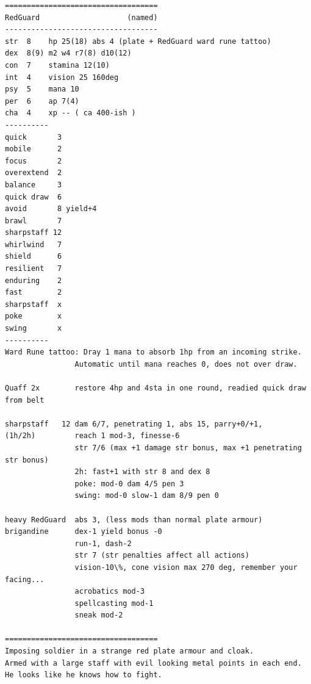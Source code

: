 \documentclass[11pt, twoside, titlepage, a4paper]{report}
\begin{document}
\goodbreak \begin{samepage} \small \begin{verbatim}
===================================
RedGuard                    (named)
-----------------------------------
str  8    hp 25(18) abs 4 (plate + RedGuard ward rune tattoo)
dex  8(9) m2 w4 r7(8) d10(12)
con  7    stamina 12(10)
int  4    vision 25 160deg
psy  5    mana 10
per  6    ap 7(4)
cha  4    xp -- ( ca 400-ish )
----------
quick       3
mobile      2
focus       2
overextend  2
balance     3
quick draw  6
avoid       8 yield+4
brawl       7
sharpstaff 12
whirlwind   7
shield      6
resilient   7
enduring    2
fast        2
sharpstaff  x
poke        x
swing       x
----------
Ward Rune tattoo: Dray 1 mana to absorb 1hp from an incoming strike.
                Automatic until mana reaches 0, does not over draw.

Quaff 2x        restore 4hp and 4sta in one round, readied quick draw from belt

sharpstaff   12 dam 6/7, penetrating 1, abs 15, parry+0/+1,
(1h/2h)         reach 1 mod-3, finesse-6
                str 7/6 (max +1 damage str bonus, max +1 penetrating str bonus)
                2h: fast+1 with str 8 and dex 8
                poke: mod-0 dam 4/5 pen 3
                swing: mod-0 slow-1 dam 8/9 pen 0

heavy RedGuard  abs 3, (less mods than normal plate armour)
brigandine      dex-1 yield bonus -0
                run-1, dash-2
                str 7 (str penalties affect all actions)
                vision-10\%, cone vision max 270 deg, remember your facing...
                acrobatics mod-3
                spellcasting mod-1
                sneak mod-2

===================================
Imposing soldier in a strange red plate armour and cloak.
Armed with a large staff with evil looking metal points in each end.
He looks like he knows how to fight.
\end{verbatim} \normalsize \end{samepage}

\
\end{document}
